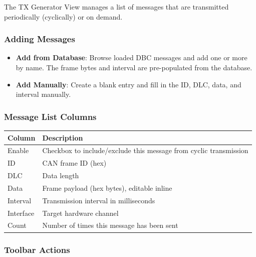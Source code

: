 \documentclass[a4paper,11pt]{article}
\newcommand{\ui}[1]{\textbf{#1}}
\begin{document}
The TX Generator View manages a list of messages that are transmitted periodically
(cyclically) or on demand.

\subsubsection{Adding Messages}

\begin{itemize}
  \item \ui{Add from Database}: Browse loaded DBC messages and add one or more by
        name. The frame bytes and interval are pre-populated from the database.
  \item \ui{Add Manually}: Create a blank entry and fill in the ID, DLC, data, and
        interval manually.
\end{itemize}

\subsubsection{Message List Columns}

\begin{table}[h]
  \centering
  \begin{tabularx}{\textwidth}{lX}
    \toprule
    \textbf{Column} & \textbf{Description} \\
    \midrule
    Enable    & Checkbox to include/exclude this message from cyclic transmission \\
    ID        & CAN frame ID (hex) \\
    DLC       & Data length \\
    Data      & Frame payload (hex bytes), editable inline \\
    Interval  & Transmission interval in milliseconds \\
    Interface & Target hardware channel \\
    Count     & Number of times this message has been sent \\
    \bottomrule
  \end{tabularx}
\end{table}

\subsubsection{Toolbar Actions}
\end{document}

